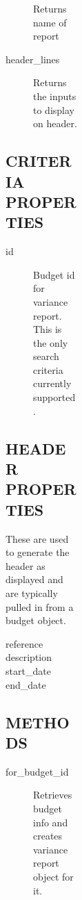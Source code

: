 \begin{description}
\begin{description}
\begin{description}
\begin{description}
\begin{description}
\begin{description}
\begin{description}
\begin{description}
\begin{description}
\begin{description}
\begin{description}
Returns name of report


\item[{header\_lines}] \mbox{}

Returns the inputs to display on header.

\end{description}
\subsection*{CRITERIA PROPERTIES\label{LedgerSMB::DBObject::Report::Budget::Variance_CRITERIA_PROPERTIES}}
\begin{description}

\item[{id}] \mbox{}

Budget id for variance report.  This is the only search criteria currently 
supported.

\end{description}
\subsection*{HEADER PROPERTIES\label{LedgerSMB::DBObject::Report::Budget::Variance_HEADER_PROPERTIES}}


These are used to generate the header as displayed and are typically pulled in 
from a budget object.

\begin{description}

\item[{reference}] \mbox{}
\item[{description}] \mbox{}
\item[{start\_date}] \mbox{}
\item[{end\_date}] \mbox{}\end{description}
\subsection*{METHODS\label{LedgerSMB::DBObject::Report::Budget::Variance_METHODS}}
\begin{description}

\item[{for\_budget\_id}] \mbox{}

Retrieves budget info and creates variance report object for it.



\end{description}
\end{description}
\end{description}
\end{description}
\end{description}
\end{description}
\end{description}
\end{description}
\end{description}
\end{description}
\end{description}
